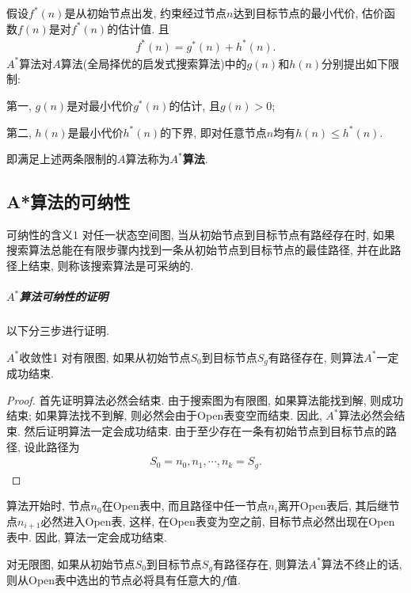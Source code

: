 假设$f^*(n)$是从初始节点出发, 约束经过节点$n$达到目标节点的最小代价, 估价函数$f(n)$是对$f^*(n)$的估计值. 且
\begin{align}
  f^*(n)=g^*(n)+h^*(n).
\end{align}
$A^*$算法对$A$算法(全局择优的启发式搜索算法)中的$g(n)$和$h(n)$分别提出如下限制:

第一, $g(n)$是对最小代价$g^*(n)$的估计, 且$g(n)>0$;

第二, $h(n)$是最小代价$h^*(n)$的下界, 即对任意节点$n$均有$h(n)\leq h^*(n)$.

即满足上述两条限制的$A$算法称为\textbf{$A^*$算法}.
\subsection{A*算法的可纳性}
\begin{mydef}{可纳性的含义}{1}
对任一状态空间图, 当从初始节点到目标节点有路经存在时, 如果搜索算法总能在有限步骤内找到一条从初始节点到目标节点的最佳路径, 并在此路径上结束, 则称该搜索算法是可采纳的.
\end{mydef}
\subparagraph{$A^*$算法可纳性的证明}
以下分三步进行证明.
\begin{mythm}{$A^*$收敛性}{1}
对有限图, 如果从初始节点$S_0$到目标节点$S_g$有路径存在, 则算法$A^*$一定成功结束.
\end{mythm}
\begin{proof}
首先证明算法必然会结束. 由于搜索图为有限图, 如果算法能找到解, 则成功结束; 如果算法找不到解, 则必然会由于Open表变空而结束. 因此, $A^*$算法必然会结束.
然后证明算法一定会成功结束. 由于至少存在一条有初始节点到目标节点的路径, 设此路径为
\begin{align}
  S_0=n_0, n_1, \cdots, n_k=S_g.
\end{align}
\end{proof}
算法开始时, 节点$n_0$在Open表中, 而且路径中任一节点$n_i$离开Open表后, 其后继节点$n_{i+1}$必然进入Open表, 这样, 在Open表变为空之前, 目标节点必然出现在Open表中. 因此, 算法一定会成功结束.
\begin{mylem}{}{}\label{AIlem001}
对无限图, 如果从初始节点$S_0$到目标节点$S_g$有路径存在, 则算法$A^*$算法不终止的话, 则从Open表中选出的节点必将具有任意大的$f$值.
\end{mylem}
